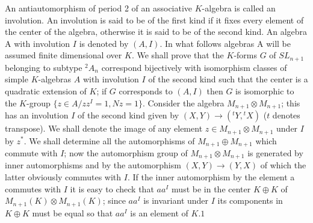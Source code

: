  \begin{defi*}%
An antiautomorphism of period 2 of an associative $K$-alge\-bra is
called an involution. An involution is said to be of the first kind if
it fixes every element of the center of the algebra, otherwise it is
said to be of the second kind. An algebra A with involution $I$ is
denoted  by $(A, I)$. In what follows algebras A will be assumed
finite dimensional over $K$. We shall prove that the $K$-forms $G$ of
$SL_{n+1}$ belonging to subtype ${}^2 A_n$ correspond bijectively
with isomorphism classes of simple $K$-algebras $A$ with involution
$I$ of the second kind such that the center is a quadratic extension
of $K$; if $G$ corresponds to $(A,I)$ then $G$ is isomorphic to the
$K$-group $\bigg\{ z \in A \bigg / zz^I = 1, Nz = 1 \bigg\}$. Consider
the algebra $M_{n+1} \otimes M_{n+1}$; this has an involution $I$ of
the second kind given by $(X,Y) \to (^tY,  {}^tX)$ ($t$ denotes
transpose). We shall denote the image of any element  $z \in M_{n+1}
\otimes M_{n+1}$ under $I$ by $z^\ast$. We shall determine all the
automorphisms of $M_{n+1} \oplus M_{n+1}$ 
which commute with $I$; now the automorphism  group of $M_{n+1}
\otimes M_{n+1}$ is generated by inner automorphisms and by the
automorphism $(X,Y) \longrightarrow (Y,X)$ of which the latter
obviously commutes with $I$. If the inner automorphism by the element
a commutes with $I$ it is easy to check that $ a a^I$ must be in the
center $ K \oplus K$ of $M_{n+1} (K) \otimes M_{n+1} (K)$; since
$a a^I$ is invariant under $I$ its components in $K \oplus K$ must be
equal so that $a a^I$ is an element of $K.1$  
  \end{defi*}
   
